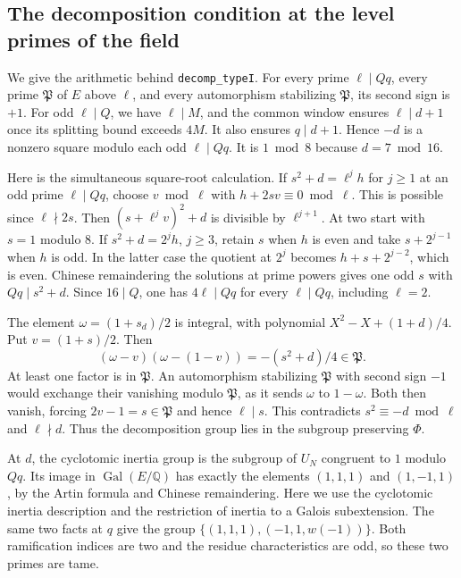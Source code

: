 \subsection{The decomposition condition at the level primes of the field}

We give the arithmetic behind \texttt{decomp\_typeI}. For every prime
$\ell\mid Qq$, every prime $\mathfrak P$ of $E$ above $\ell$, and
every automorphism stabilizing $\mathfrak P$, its second sign is $+1$.
For odd $\ell\mid Q$, we have $\ell\mid M$, and the common window
ensures $\ell\mid d+1$ once its splitting bound exceeds $4M$.
It also ensures $q\mid d+1$. Hence $-d$ is a nonzero square
modulo each odd $\ell\mid Qq$. It is $1\bmod8$ because $d=7\bmod16$.

Here is the simultaneous square-root calculation.
If $s^2+d=\ell^j h$ for $j\ge1$ at an odd prime $\ell\mid Qq$,
choose $v\bmod\ell$ with $h+2sv\equiv0\bmod\ell$. This is possible
since $\ell\nmid 2s$. Then $(s+\ell^jv)^2+d$ is divisible by
$\ell^{j+1}$. At two start with $s=1$ modulo $8$. If
$s^2+d=2^j h$, $j\ge3$, retain $s$ when $h$ is even and take
$s+2^{j-1}$ when $h$ is odd. In the latter case the quotient at $2^j$
becomes $h+s+2^{j-2}$, which is even. Chinese remaindering the
solutions at prime powers gives one odd $s$ with $Qq\mid s^2+d$.
Since $16\mid Q$, one has $4\ell\mid Qq$ for every $\ell\mid Qq$,
including $\ell=2$.

The element $\omega=(1+s_d)/2$ is integral, with polynomial
$X^2-X+(1+d)/4$. Put $v=(1+s)/2$. Then
\[
              (\omega-v)(\omega-(1-v))=-(s^2+d)/4\in\mathfrak P .
\]
At least one factor is in $\mathfrak P$. An automorphism stabilizing
$\mathfrak P$ with second sign $-1$ would exchange their vanishing
modulo $\mathfrak P$, as it sends $\omega$ to $1-\omega$. Both then
vanish, forcing $2v-1=s\in\mathfrak P$ and hence $\ell\mid s$.
This contradicts $s^2\equiv-d\bmod\ell$ and $\ell\nmid d$.
Thus the decomposition group lies in the subgroup preserving $\Phi$.

At $d$, the cyclotomic inertia group is the subgroup of $U_N$
congruent to $1$ modulo $Qq$. Its image in $\operatorname{Gal}(E/\mathbb Q)$
has exactly the elements $(1,1,1)$ and $(1,-1,1)$, by the Artin
formula and Chinese remaindering. Here we use the cyclotomic inertia
description and the restriction of inertia to a Galois subextension.
The same two facts at $q$ give the group
$\{(1,1,1),(-1,1,w(-1))\}$. Both ramification indices are two
and the residue characteristics are odd, so these two primes are tame.

